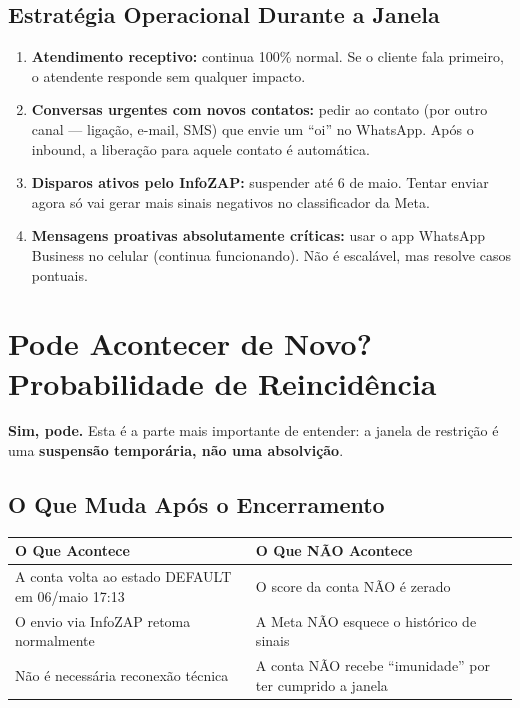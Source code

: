 \documentclass[12pt, a4paper]{article}
\begin{document}
\subsection{Estratégia Operacional Durante a Janela}

\begin{enumerate}
    \item \textbf{Atendimento receptivo:} continua 100\% normal. Se o cliente fala primeiro, o atendente responde sem qualquer impacto.
    \item \textbf{Conversas urgentes com novos contatos:} pedir ao contato (por outro canal --- ligação, e-mail, SMS) que envie um ``oi'' no WhatsApp. Após o inbound, a liberação para aquele contato é automática.
    \item \textbf{Disparos ativos pelo InfoZAP:} suspender até 6 de maio. Tentar enviar agora só vai gerar mais sinais negativos no classificador da Meta.
    \item \textbf{Mensagens proativas absolutamente críticas:} usar o app WhatsApp Business no celular (continua funcionando). Não é escalável, mas resolve casos pontuais.
\end{enumerate}

\needspace{10cm}

\section{Pode Acontecer de Novo? Probabilidade de Reincidência}

\textbf{Sim, pode.} Esta é a parte mais importante de entender: a janela de restrição é uma \textbf{suspensão temporária, não uma absolvição}.

\subsection{O Que Muda Após o Encerramento}

\begin{table}[H]
    \centering
    \renewcommand{\arraystretch}{1.5}
    \begin{tabularx}{\textwidth}{X X}
        \toprule
        \rowcolor{tableHeader} \textbf{O Que Acontece} & \textbf{O Que NÃO Acontece} \\
        \midrule
        A conta volta ao estado DEFAULT em 06/maio 17:13 & O score da conta NÃO é zerado \\
        \rowcolor{lightGray}
        O envio via InfoZAP retoma normalmente & A Meta NÃO esquece o histórico de sinais \\
        Não é necessária reconexão técnica & A conta NÃO recebe ``imunidade'' por ter cumprido a janela \\
        \bottomrule
    \end{tabularx}
\end{table}
\end{document}

